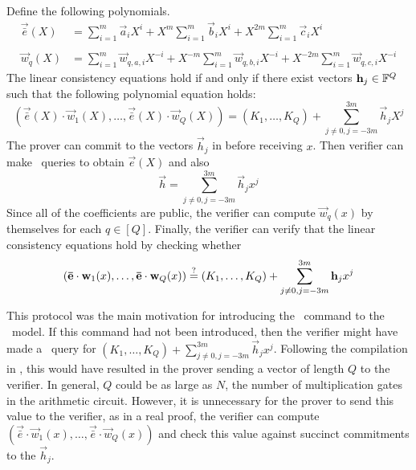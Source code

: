 Define the following polynomials.
\begin{align*}
\vec{\bar{e}}(X) &= \sum_{i=1}^m \vec{a}_i X^i + X^m \sum_{i=1}^m \vec{b}_{i} X^i + X^{2m} \sum_{i=1}^m \vec{c}_{i} X^i \\ \\
\vec{w}_q(X) &= \sum_{i=1}^m \vec{w}_{q,a,i} X^{-i} + X^{-m} \sum_{i=1}^m \vec{w}_{q,b,i} X^{-i} + X^{-2m} \sum_{i=1}^m \vec{w}_{q,c,i} X^{-i}
\end{align*}
The linear consistency equations hold if and only if there exist vectors $\mathbf{h}_j \in \mathbb{F}^Q$ such that the following polynomial equation holds:
\[
( \vec{\bar{e}}(X) \cdot \vec{w}_1(X),\ldots, \vec{\bar{e}}(X)\cdot \vec{w}_Q(X) )  = (K_1,\ldots,K_Q) + \sum_{j\neq 0, j=-3m}^{3m} \vec{h}_j {X^j}
\]
The prover can commit to the vectors $\vec{h}_j$ in before receiving $x$. Then verifier can make \ILC \ queries to obtain $\vec{e}(X)$ and also
\[
\vec{h} = \sum_{j\neq 0, j=-3m}^{3m} \vec{h}_j {x^j}
\]
Since all of the coefficients are public, the verifier can compute $\vec{w}_q(x)$ by themselves for each $q \in [Q]$. Finally, the verifier can verify that the linear consistency equations hold by checking whether
\[
( \mathbf{\bar{e}}\cdot \mathbf{w}_1(x),\ldots, \mathbf{\bar{e}}\cdot \mathbf{w}_Q(x) ) \overset{?}{=} (K_1,\ldots,K_Q) + \sum_{j\neq 0, j=-3m}^{3m} \mathbf{h}_j {x^j}
\]

This protocol was the main motivation for introducing the \ILCcheck\ command to the \ILC\ model. If this command had not been introduced, then the verifier might have made a \ILCopen\ query for $(K_1,\ldots,K_Q) + \sum_{j\neq 0, j=-3m}^{3m} \vec{h}_j {x^j}$. Following the compilation in \cite{BootleCGGHJ17}, this would have resulted in the prover sending a vector of length $Q$ to the verifier. In general, $Q$ could be as large as $N$, the number of multiplication gates in the arithmetic circuit. However, it is unnecessary for the prover to send this value to the verifier, as in a real proof, the verifier can compute $( \vec{\bar{e}}\cdot \vec{w}_1(x),\ldots, \vec{\bar{e}}\cdot \vec{w}_Q(x) )$ and check this value against succinct commitments to the $\vec{h}_j$.

